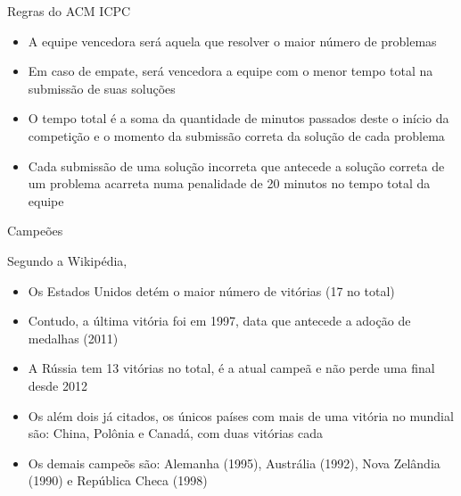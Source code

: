 \begin{frame}[fragile]{Regras do ACM ICPC}

    \begin{itemize}
        \item A equipe vencedora será aquela que resolver o maior número de problemas
        \item Em caso de empate, será vencedora a equipe com o menor tempo total na 
        submissão de suas soluções
        \item O tempo total é a soma da quantidade de minutos passados deste o início da
        competição e o momento da submissão correta da solução de cada problema
        \item Cada submissão de uma solução incorreta que antecede a 
        solução correta de um problema acarreta numa penalidade de 20 minutos no tempo total da
        equipe
    \end{itemize}

\end{frame}

\begin{frame}[fragile]{Campeões}

    Segundo a Wikipédia,

    \begin{itemize}
        \item Os Estados Unidos detém o maior número de vitórias (17 no total)
        \item Contudo, a última vitória foi em 1997, data que antecede a adoção de medalhas (2011)
        \item A Rússia tem 13 vitórias no total, é a atual campeã e não perde uma final desde
            2012
        \item Os além dois já citados, os únicos países com mais de uma vitória no mundial são:
            China, Polônia e Canadá, com duas vitórias cada
        \item Os demais campeõs são: Alemanha (1995), Austrália (1992), Nova Zelândia (1990) e
            República Checa (1998)
    \end{itemize}

\end{frame}
